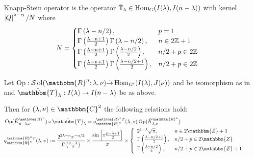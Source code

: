 \documentclass[8pt,pdf,notes]{beamer}
\newcommand{\assign}{:=}
\newcommand{\tmop}[1]{\ensuremath{\operatorname{#1}}}
\theoremstyle{mystyle}
\begin{document}
\begin{frame}
	\begin{definition}
		Knapp-Stein operator is the operator $\tilde{\mathbb{T}}_{\lambda}\in\mbox{Hom}_{G}(I(\lambda),I(n-\lambda))$
		with kernel $\left|Q\right|^{\lambda-n}/N$ where \begin{equation*}
			N=\begin{cases}
				\Gamma\left( \lambda-n/2 \right),&p=1\\
				\Gamma\left( \frac{\lambda-n+1}{2} \right)\Gamma\left( \lambda-n/2 \right),&n\in2\mathbb{Z}+1\\
				\Gamma\left( \frac{\lambda-n+1}{2} \right)\Gamma\left( \frac{\lambda-n/2}{2} \right),&n/2+p\in2\mathbb{Z}\\
				\Gamma\left( \frac{\lambda-n+1}{2} \right)\Gamma\left( \frac{\lambda-n/2+1}{2} \right),&n/2+p\in2\mathbb{Z}\\
			\end{cases}
		\end{equation*}
	\end{definition}
	\begin{theorem}
		
  Let $\tmop{Op} : \mathcal{S} \tmop{ol} (
  \mathbbm{R}^n ; \lambda, \nu) \tilde{\rightarrow} \tmop{Hom}_{G'} ( I (
  \lambda), J ( \nu))$ and be isomorphism as in \cite{kobayashi2015symmetry}
  and $\tilde{\mathbbm{T}}_{\lambda} : I ( \lambda)
  \rightarrow I ( n - \lambda)$ be as above.
  
  Then for $( \lambda, \nu) \in \mathbbm{C}^2$ the following relations hold:
  \begin{eqnarray}
    & \tmop{Op} ( \tilde{K}_{n - \lambda, \nu}^{\mathbbm{R}^n}) \circ
    \tilde{\mathbbm{T}}_{\lambda} = q^{\mathbbm{R}^n T}_{\mathbbm{R}^n} (
    \lambda, \nu) \tmop{Op} ( \tilde{K}_{\lambda, \nu}^{\mathbbm{R}^n}) & 
    \nonumber\\
    & q^{\mathbbm{R}^n T}_{\mathbbm{R}^n} ( \lambda, \nu) \assign \frac{2^{2
    \lambda - n} \pi^{- n / 2}}{\Gamma \left( \frac{n - \lambda}{2} \right)}
    \times \frac{\sin \left[ \pi \frac{p - \lambda + 1}{2} \right]}{\pi}
    \times \left\{ \begin{array}{ll}
      2^{1 - \lambda} \sqrt{\pi}, & n \in 2\mathbbm{Z}+ 1\\
      \Gamma \left( \frac{\lambda - n / 2 + 1}{2} \right), & n / 2 + p \in
      2\mathbbm{Z}\\
      \Gamma \left( \frac{\lambda - n / 2}{2} \right), & n / 2 + p \in
      2\mathbbm{Z}+ 1
    \end{array} \right. &  \nonumber
  \end{eqnarray}
		\label{}
	\end{theorem}
\end{frame}
\end{document}
